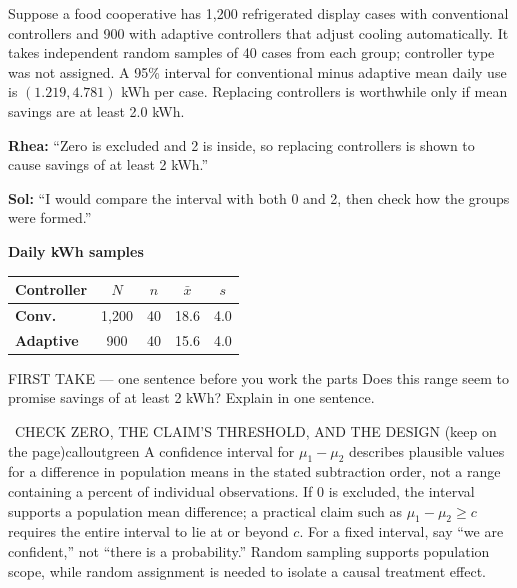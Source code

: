 \documentclass[11pt]{article}
\begin{document}
\clearpage
{}

Suppose a food cooperative has 1{,}200 refrigerated display cases with conventional controllers and 900 with adaptive controllers that adjust cooling automatically. It takes independent random samples of 40 cases from each group; controller type was not assigned. A 95\% interval for conventional minus adaptive mean daily use is $(1.219,4.781)$ kWh per case. Replacing controllers is worthwhile only if mean savings are at least 2.0 kWh.\par\smallskip \textbf{Rhea:} ``Zero is excluded and 2 is inside, so replacing controllers is shown to cause savings of at least 2 kWh.''\par \textbf{Sol:} ``I would compare the interval with both 0 and 2, then check how the groups were formed.''\par
\begin{center}
\textbf{Daily kWh samples}\par\smallskip
\begin{tabular}{|l|c|c|c|c|}
\hline
\textbf{Controller} & \textbf{$N$} & \textbf{$n$} & \textbf{$\bar x$} & \textbf{$s$} \\ \hline
\textbf{Conv.} & 1,200 & 40 & 18.6 & 4.0 \\ \hline
\textbf{Adaptive} & 900 & 40 & 15.6 & 4.0 \\ \hline
\end{tabular}
\end{center}
\begin{firsttakebox}{FIRST TAKE --- one sentence before you work the parts}
Does this range seem to promise savings of at least 2 kWh? Explain in one sentence.\par
{}
\end{firsttakebox}

\begin{callout}{\IconBook\ CHECK ZERO, THE CLAIM'S THRESHOLD, AND THE DESIGN (keep on the page)}{calloutgreen}
A confidence interval for $\mu_1-\mu_2$ describes plausible values for a difference in
population means in the stated subtraction order, not a range containing a percent of individual
observations. If 0 is excluded, the interval supports a population mean difference; a practical
claim such as $\mu_1-\mu_2\geq c$ requires the entire interval to lie at or beyond $c$.
For a fixed interval, say ``we are confident,'' not ``there is a probability.'' Random sampling
supports population scope, while random assignment is needed to isolate a causal treatment effect.
\end{callout}
\end{document}

